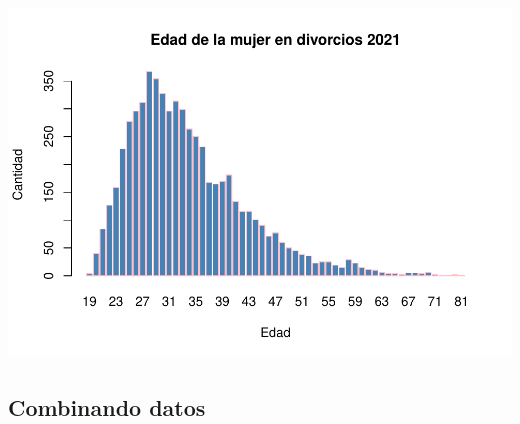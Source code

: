 \documentclass[
]{article}
\begin{document}
\hypertarget{section}{%
\subsection[]{\texorpdfstring{\protect\includegraphics{Proyecto_files/figure-latex/unnamed-chunk-29-1.pdf}}{}}\label{section}}

\hypertarget{combinando-datos}{%
\subsection{Combinando datos}\label{combinando-datos}}
\end{document}
